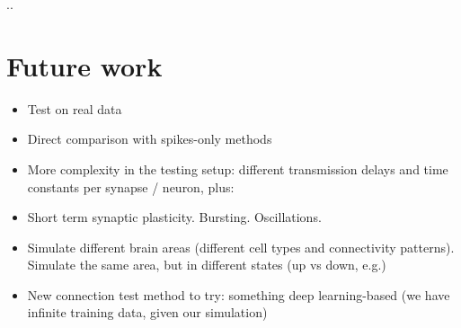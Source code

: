 \documentclass[a4paper, oneside, 11pt]{memoir}
\begin{document}
..

\section{Future work}

\begin{itemize}
    \item Test on real data
    \item Direct comparison with spikes-only methods
    \item More complexity in the testing setup: different transmission delays and time constants per synapse / neuron, plus:
    \item Short term synaptic plasticity. Bursting. Oscillations.
    \item Simulate different brain areas (different cell types and connectivity patterns). Simulate the same area, but in different states (up vs down, e.g.)
    \item New connection test method to try: something deep learning-based (we have infinite training data, given our simulation)
\end{itemize}

\References
\end{document}
